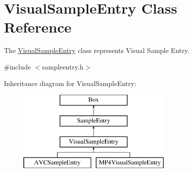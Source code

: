 \hypertarget{class_visual_sample_entry}{\section{Visual\-Sample\-Entry Class Reference}
\label{class_visual_sample_entry}
}


The \hyperlink{class_visual_sample_entry}{Visual\-Sample\-Entry} class represents Visual Sample Entry.  




{\ttfamily \#include $<$sampleentry.\-h$>$}

Inheritance diagram for Visual\-Sample\-Entry\-:\begin{figure}[H]
\begin{center}
\leavevmode
\includegraphics[height=4.000000cm]{class_visual_sample_entry}
\end{center}
\end{figure}
